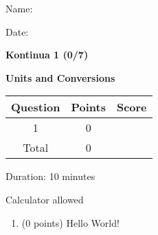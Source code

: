 \documentclass[letterpaper,12pt,addpoints]{exam}
\begin{document}
{\selectfont
\noindent \parbox{0.65\textwidth}{
Name: \hrulefill \\

\vspace{0.2cm}

Date:\ \hrulefill

\vspace{1.0cm}



\textbf{Kontinua 1 (0/7)}

\Large \textbf{Units and Conversions}

}
\parbox{0.35\textwidth}{

\begin{flushright}
\bgroup
\def\arraystretch{1.8}
\begin{tabular}{c|c|c}
\hline
Question & Points & Score \\
\hline
1 & 0 & \\
\hline
\hline
Total & 0 & \\
\hline
\end{tabular}
\egroup
\medskip

Duration: 10 minutes

Calculator allowed

\end{flushright}
}
} %
\begin{enumerate}

\vspace{0.25cm}
\item (0 points) Hello World!

\vspace{0.0cm}

\end{enumerate}
\end{document}
